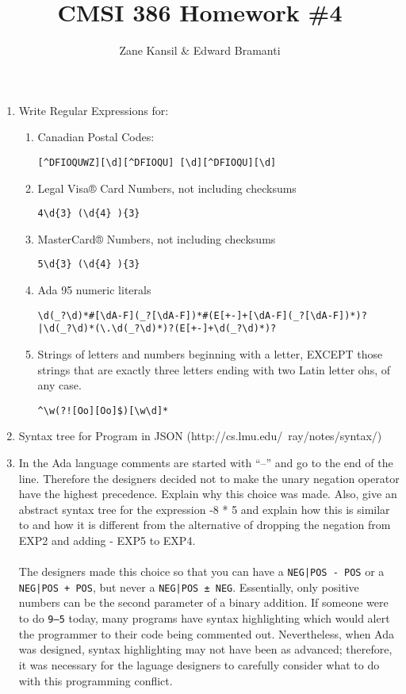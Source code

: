 \documentclass{article}
\begin{document}
\title{CMSI 386 Homework \#4}
\author{Zane Kansil \& Edward Bramanti}
\maketitle
\begin{enumerate}
\item Write Regular Expressions for:
\begin{enumerate}
\item Canadian Postal Codes:
\begin{verbatim}
[^DFIOQUWZ][\d][^DFIOQU] [\d][^DFIOQU][\d]
\end{verbatim}
\item Legal Visa® Card Numbers, not including checksums
\begin{verbatim}
4\d{3} (\d{4} ){3}
\end{verbatim}
\item MasterCard® Numbers, not including checksums
\begin{verbatim}
5\d{3} (\d{4} ){3}
\end{verbatim}
\item Ada 95 numeric literals
\begin{verbatim}
\d(_?\d)*#[\dA-F](_?[\dA-F])*#(E[+-]+[\dA-F](_?[\dA-F])*)?
|\d(_?\d)*(\.\d(_?\d)*)?(E[+-]+\d(_?\d)*)?
\end{verbatim}
\item Strings of letters and numbers beginning with a letter, EXCEPT those strings that are exactly three letters ending with two Latin letter ohs, of any case.
\begin{verbatim}
^\w(?![Oo][Oo]$)[\w\d]*
\end{verbatim}
\end{enumerate}
\pagebreak
\item Syntax tree for Program in JSON (http://cs.lmu.edu/~ray/notes/syntax/)

\pagebreak
\item In the Ada language comments are started with ``--'' and go to the end of the line. Therefore the designers decided not to make the unary negation operator have the highest precedence. Explain why this choice was made. Also, give an abstract syntax tree for the expression -8 * 5 and explain how this is similar to and how it is different from the alternative of dropping the negation from EXP2 and adding - EXP5 to EXP4. \\
\\
The designers made this choice so that you can have a \texttt{NEG|POS - POS} or a \texttt{NEG|POS + POS}, but never a \texttt{NEG|POS ± NEG}. Essentially, only positive numbers can be the second parameter of a binary addition. If someone were to do \texttt{9--5} today, many programs have syntax highlighting which would alert the programmer to their code being commented out. Nevertheless, when Ada was designed, syntax highlighting may not have been as advanced; therefore, it was necessary for the laguage designers to carefully consider what to do with this programming conflict.

\end{enumerate}
\end{document}
